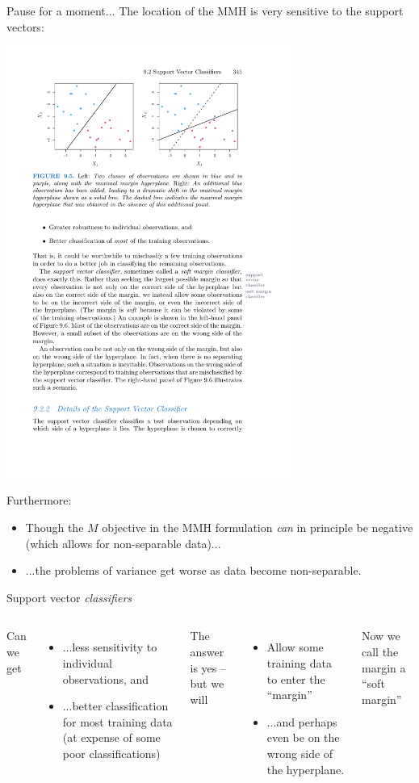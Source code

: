 \documentclass[mathserif, aspectratio=169]{beamer}
\begin{document}
\begin{frame}{Pause for a moment...}
The location of the MMH is very sensitive to the support vectors:

\includegraphics[width=0.7\textwidth]{ISLR_9point5}

Furthermore:
\begin{itemize}
\item Though the $M$ objective in the MMH formulation \textit{can} in principle be negative (which allows for non-separable data)...
\item ...the problems of variance get worse as data become non-separable.
\end{itemize}
\end{frame}

\begin{frame}{Support vector \textit{classifiers}}
\begin{columns}
Can we get
\begin{itemize}
\item ...less sensitivity to individual observations, and
\item ...better classification for most training data (at expense of some poor classifications)
\end{itemize}
The answer is yes -- but we will
\begin{itemize}
\item Allow some training data to enter the ``margin''
\item ...and perhaps even be on the wrong side of the hyperplane.
\end{itemize}
Now we call the margin a ``soft margin''

\end{columns}
\end{frame}
\end{document}
